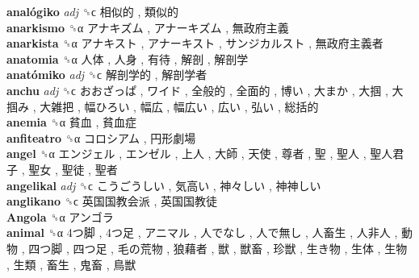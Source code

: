 \textbf{analógiko} \emph{adj}  ␝ϲ   相似的 ,  類似的   \\
\textbf{anarkismo} ␝α   アナキズム ,  アナーキズム ,  無政府主義   \\
\textbf{anarkista} ␝α   アナキスト ,  アナーキスト ,  サンジカルスト ,  無政府主義者   \\
\textbf{anatomia} ␝α   人体 ,  人身 ,  有待 ,  解剖 ,  解剖学   \\
\textbf{anatómiko} \emph{adj}  ␝ϲ   解剖学的 ,  解剖学者   \\
\textbf{anchu} \emph{adj}  ␝ϲ   おおざっぱ ,  ワイド ,  全般的 ,  全面的 ,  博い ,  大まか ,  大掴 ,  大掴み ,  大雑把 ,  幅ひろい ,  幅広 ,  幅広い ,  広い ,  弘い ,  総括的   \\
\textbf{anemia} ␝α   貧血 ,  貧血症   \\
\textbf{anfiteatro} ␝α   コロシアム ,  円形劇場   \\
\textbf{angel} ␝α   エンジェル ,  エンゼル ,  上人 ,  大師 ,  天使 ,  尊者 ,  聖 ,  聖人 ,  聖人君子 ,  聖女 ,  聖徒 ,  聖者   \\
\textbf{angelikal} \emph{adj}  ␝ϲ   こうごうしい ,  気高い ,  神々しい ,  神神しい   \\
\textbf{anglikano} ␝ϲ   英国国教会派 ,  英国国教徒   \\
\textbf{Angola} ␝α   アンゴラ   \\
\textbf{animal} ␝α   4つ脚 ,  4つ足 ,  アニマル ,  人でなし ,  人で無し ,  人畜生 ,  人非人 ,  動物 ,  四つ脚 ,  四つ足 ,  毛の荒物 ,  狼藉者 ,  獣 ,  獣畜 ,  珍獣 ,  生き物 ,  生体 ,  生物 ,  生類 ,  畜生 ,  鬼畜 ,  鳥獣   \\

